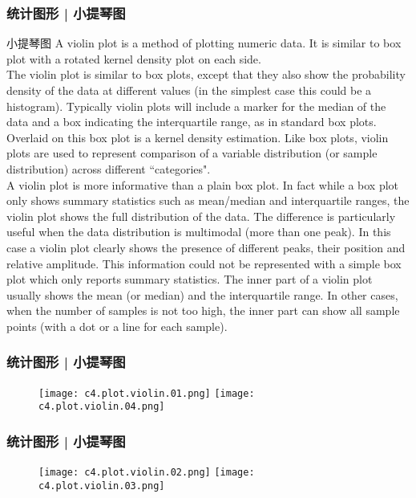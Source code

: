 \begin{frame}
  \frametitle{统计图形 | 小提琴图}
  \begin{block}{小提琴图}
    {\footnotesize
    A violin plot is a method of plotting numeric data. It is similar to box plot with a rotated kernel density plot on each side.\\
    \vspace{0.5em}
The violin plot is similar to box plots, except that they also show the probability density of the data at different values (in the simplest case this could be a histogram). Typically violin plots will include a marker for the median of the data and a box indicating the interquartile range, as in standard box plots. Overlaid on this box plot is a kernel density estimation. Like box plots, violin plots are used to represent comparison of a variable distribution (or sample distribution) across different ``categories".\\
\vspace{0.5em}
A violin plot is more informative than a plain box plot. In fact while a box plot only shows summary statistics such as mean/median and interquartile ranges, the violin plot shows the full distribution of the data. The difference is particularly useful when the data distribution is multimodal (more than one peak). In this case a violin plot clearly shows the presence of different peaks, their position and relative amplitude. This information could not be represented with a simple box plot which only reports summary statistics. The inner part of a violin plot usually shows the mean (or median) and the interquartile range. In other cases, when the number of samples is not too high, the inner part can show all sample points (with a dot or a line for each sample).\\
    }
  \end{block}
\end{frame}

\begin{frame}
  \frametitle{统计图形 | 小提琴图}
  \begin{figure}
    \centering
    \texttt{[image: c4.plot.violin.01.png]}
    \texttt{[image: c4.plot.violin.04.png]}
  \end{figure}
\end{frame}

\begin{frame}
  \frametitle{统计图形 | 小提琴图}
  \begin{figure}
    \centering
    \texttt{[image: c4.plot.violin.02.png]}
    \texttt{[image: c4.plot.violin.03.png]}
  \end{figure}
\end{frame}

